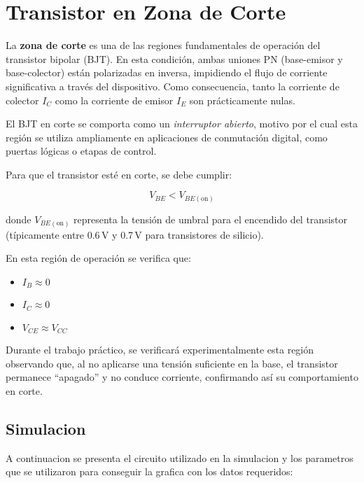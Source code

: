 \chapter{Transistor en Zona de Corte}
    La \textbf{zona de corte} es una de las regiones fundamentales de operación del transistor bipolar (BJT). En esta condición, ambas uniones PN (base-emisor y base-colector) están polarizadas en inversa, impidiendo el flujo de corriente significativa a través del dispositivo. Como consecuencia, tanto la corriente de colector $I_C$ como la corriente de emisor $I_E$ son prácticamente nulas.

    El BJT en corte se comporta como un \textit{interruptor abierto}, motivo por el cual esta región se utiliza ampliamente en aplicaciones de conmutación digital, como puertas lógicas o etapas de control.
    
    Para que el transistor esté en corte, se debe cumplir:
    
    \[
    V_{BE} < V_{BE(\text{on})}
    \]
    
    donde $V_{BE(\text{on})}$ representa la tensión de umbral para el encendido del transistor (típicamente entre 0.6\,V y 0.7\,V para transistores de silicio).
    
    En esta región de operación se verifica que:
    
    \begin{itemize}
      \item $I_B \approx 0$
      \item $I_C \approx 0$
      \item $V_{CE} \approx V_{CC}$
    \end{itemize}
    
    Durante el trabajo práctico, se verificará experimentalmente esta región observando que, al no aplicarse una tensión suficiente en la base, el transistor permanece ``apagado'' y no conduce corriente, confirmando así su comportamiento en corte.


\newpage


  \section{Simulacion}


  A continuacion se presenta el circuito utilizado en la simulacion y los parametros que se utilizaron para conseguir la grafica con los datos requeridos:




